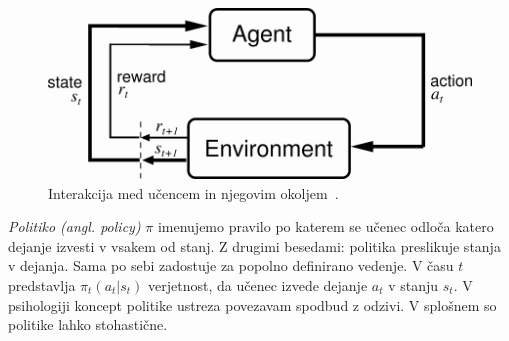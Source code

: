 \documentclass[a4paper, oneside, 12pt]{report}
\begin{document}
\begin{figure}[htbp]
\begin{center}
\includegraphics[scale=1.0]{AgentEnvironment.png}
\caption{Interakcija med učencem in njegovim okoljem~\cite{ReinforcementLearningAnIntroduction}.}
\label{figure:AgentEnvironment}
\end{center}
\end{figure}

{\em Politiko (angl. policy)} $\pi$ imenujemo pravilo po katerem se učenec odloča katero dejanje izvesti v vsakem od stanj. Z drugimi besedami: politika preslikuje stanja v dejanja. Sama po sebi zadostuje za popolno definirano vedenje. V času $t$ predstavlja $\pi_t(a_t|s_t)$ verjetnost, da učenec izvede dejanje $a_t$ v stanju $s_t$. V psihologiji koncept politike ustreza povezavam spodbud z odzivi. V splošnem so politike lahko stohastične.
\end{document}
